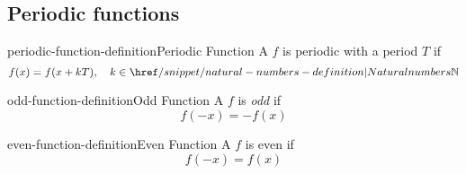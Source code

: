 \documentclass[preview]{standalone}
\begin{document}
\subsection{Periodic functions}

\begin{snippetdefinition}{periodic-function-definition}{Periodic Function}
    A \function \(f\) is periodic with a period \(T\) if
    \[
        f(x) = f(x + kT), \quad k \in \naturalnumbers
    \]
\end{snippetdefinition}

\begin{snippetdefinition}{odd-function-definition}{Odd Function}
    A \function \(f\) is \textit{odd} if
    \[
        f(-x) = -f(x)
    \]
\end{snippetdefinition}

\begin{snippetdefinition}{even-function-definition}{Even Function}
    A \function \(f\) is even if
    \[
        f(-x) = f(x)
    \]
\end{snippetdefinition}
\end{document}
